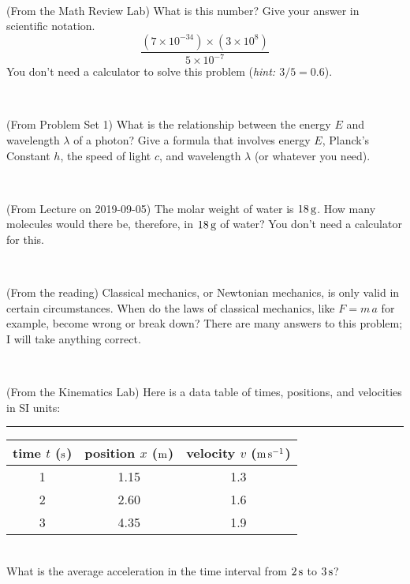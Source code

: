 \documentclass[12pt, letterpaper]{article}
\begin{document}
\vfill ~

\begin{problem} (From the Math Review Lab)
What is this number? Give your answer in scientific notation.
$$
\frac{(7\times10^{-34})\times(3\times10^8)}{5\times10^{-7}}
$$
You don't need a calculator to solve this problem (\textit{hint: $3/5=0.6$}).
\end{problem}


\vfill ~


\clearpage


\begin{problem} (From Problem Set 1)
What is the relationship between the energy $E$ and wavelength
$\lambda$ of a photon? Give a formula that involves energy $E$,
Planck's Constant $h$, the speed of light $c$, and wavelength
$\lambda$ (or whatever you need).
\end{problem}

\vfill ~

\begin{problem} (From Lecture on 2019-09-05)
The molar weight of water is $18\,\mathrm{g}$. How many molecules would there
be, therefore, in $18\,\mathrm{g}$ of water? You don't need a calculator for
this.
\end{problem}


\vfill ~

\begin{problem} (From the reading)
Classical mechanics, or Newtonian mechanics, is only valid in certain
circumstances. When do the laws of classical mechanics, like $F =
m\,a$ for example, become wrong or break down? There are many answers
to this problem; I will take anything correct.
\end{problem}


\vfill ~

\begin{problem} (From the Kinematics Lab)
Here is a data table of times, positions, and velocities in SI units:\\
\rule{1.0in}{0pt}\begin{tabular}{c|c|c}
time $t$ ($\mathrm{s}$) & position $x$ ($\mathrm{m}$) & velocity $v$ ($\mathrm{m}\,\mathrm{s}^{-1}$) \\
\hline
1 & 1.15 & 1.3 \\
2 & 2.60 & 1.6 \\
3 & 4.35 & 1.9 \\
\hline
\end{tabular}\\
What is the average acceleration in the time interval from $2\,\mathrm{s}$ to $3\,\mathrm{s}$?
\end{problem}
\end{document}
